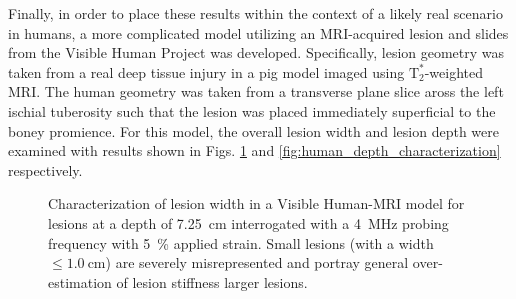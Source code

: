 			Finally, in order to place these results within the context of a likely real scenario in humans, a more complicated model utilizing an MRI-acquired lesion and slides from the Visible Human Project \cite{visiblehuman} was developed. Specifically, lesion geometry was taken from a real deep tissue injury in a pig model imaged using $\mathrm{T}_2^*$-weighted MRI. The human geometry was taken from a transverse plane slice aross the left ischial tuberosity such that the lesion was placed immediately superficial to the boney promience. For this model, the overall lesion width and lesion depth were examined with results shown in Figs. \ref{fig:human_size_characterization} and \ref{fig:human_depth_characterization} respectively.

			\begin{figure}[!htb]
				\centering
				\caption[Quasi-static Visible Human model lesion width characterization]{Characterization of lesion width in a Visible Human-MRI model for lesions at a depth of \SI{7.25}{\cm} interrogated with a \SI{4}{\MHz} probing frequency with \SI{5}{\percent} applied strain. Small lesions (with a width $\leq \SI{1.0}{\cm}$) are severely misrepresented and portray general over-estimation of lesion stiffness larger lesions.}
				\label{fig:human_size_characterization}
			\end{figure}

